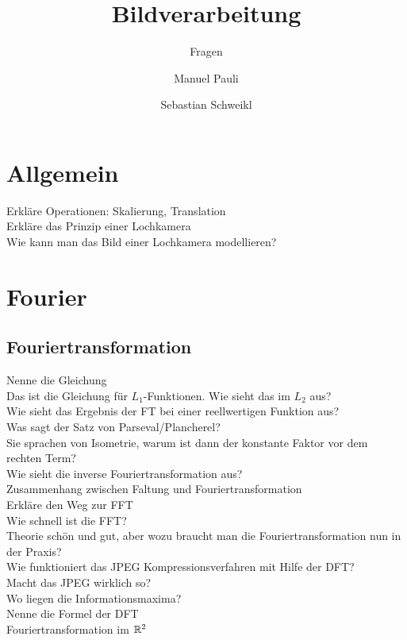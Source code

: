 
\usepackage[pdftex]{graphicx}  


\title{Bildverarbeitung}
\subtitle{Fragen}
\author{Manuel Pauli\and{}Sebastian Schweikl}

\maketitle
\section{Allgemein} 
\begin{description}
	\item[Erkläre Operationen: Skalierung, Translation]
	\item[Erkläre das Prinzip einer Lochkamera]
    \item[Wie kann man das Bild einer Lochkamera modellieren?]
\end{description}	
\section{Fourier}
\subsection{Fouriertransformation}
\begin{description}
	\item[Nenne die Gleichung]
    \item[Das ist die Gleichung für $L_1$-Funktionen. Wie sieht das im $L_2$ aus?]
	\item[Wie sieht das Ergebnis der FT bei einer reellwertigen Funktion aus?]
    \item[Was sagt der Satz von Parseval/Plancherel?]
    \item[Sie sprachen von Isometrie, warum ist dann der konstante Faktor vor dem rechten Term?]
	\item[Wie sieht die inverse Fouriertransformation aus?]
	\item[Zusammenhang zwischen Faltung und Fouriertransformation]
	\item[Erkläre den Weg zur FFT]
	\item[Wie schnell ist die FFT?]
    \item[Theorie schön und gut, aber wozu braucht man die Fouriertransformation nun in der Praxis?]
	\item[Wie funktioniert das JPEG Kompressionsverfahren mit Hilfe der DFT?]
    \item[Macht das JPEG wirklich so?]
	\item[Wo liegen die Informationsmaxima?]
	\item[Nenne die Formel der DFT]
	\item[Fouriertransformation im $\mathbb{R}^2$]
\end{description}
